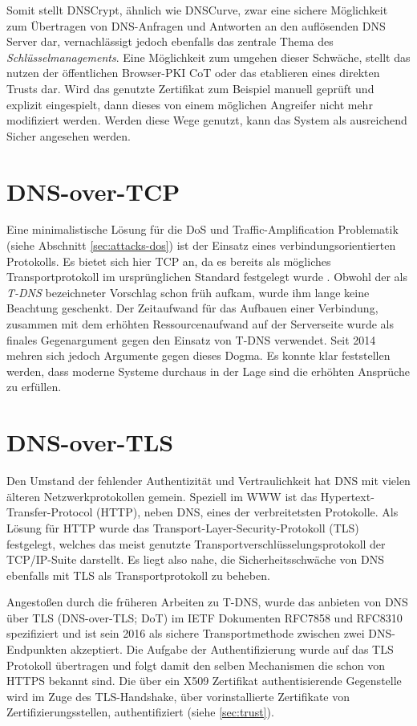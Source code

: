 Somit stellt DNSCrypt, ähnlich wie DNSCurve, zwar eine sichere  Möglichkeit zum Übertragen von DNS-Anfragen und Antworten an den auflösenden DNS Server dar, vernachlässigt jedoch ebenfalls das zentrale Thema des \textit{Schlüsselmanagements}. Eine Möglichkeit zum umgehen dieser Schwäche, stellt das nutzen der öffentlichen Browser-PKI CoT oder das etablieren eines direkten Trusts dar. Wird das genutzte Zertifikat zum Beispiel manuell geprüft und explizit eingespielt, dann dieses von einem möglichen Angreifer nicht mehr modifiziert werden. Werden diese Wege genutzt, kann das System als ausreichend Sicher angesehen werden.

\section{DNS-over-TCP}
Eine minimalistische Lösung für die DoS und Traffic-Amplification Problematik (siehe Abschnitt \ref{sec:attacks-dos}) ist der Einsatz eines verbindungsorientierten Protokolls. Es bietet sich hier TCP an, da es bereits als mögliches Transportprotokoll im ursprünglichen Standard festgelegt wurde \cite{rfc1035}. Obwohl der als \textit{T-DNS} bezeichneter Vorschlag schon früh aufkam, wurde ihm lange keine Beachtung geschenkt. Der Zeitaufwand für das Aufbauen einer Verbindung, zusammen mit dem erhöhten Ressourcenaufwand auf der Serverseite wurde als finales Gegenargument gegen den Einsatz von T-DNS verwendet. Seit 2014 mehren sich jedoch Argumente gegen dieses Dogma. Es konnte klar feststellen werden, dass moderne Systeme durchaus in der Lage sind die erhöhten Ansprüche zu erfüllen\cite{Zhu2015}. 

\section{DNS-over-TLS}
\label{sec:tec-dot}
Den Umstand der fehlender Authentizität und Vertraulichkeit hat DNS mit vielen älteren Netzwerkprotokollen gemein. Speziell im WWW ist das Hypertext-Transfer-Protocol (HTTP), neben DNS, eines der verbreitetsten Protokolle. Als Lösung für HTTP wurde das Transport-Layer-Security-Protokoll (TLS) festgelegt, welches das meist genutzte Transportverschlüsselungsprotokoll der TCP/IP-Suite darstellt. Es liegt also nahe, die Sicherheitsschwäche von DNS ebenfalls mit TLS als Transportprotokoll zu beheben.

Angestoßen durch die früheren Arbeiten zu T-DNS, wurde das anbieten von DNS über TLS (DNS-over-TLS; DoT) im IETF Dokumenten RFC7858\cite{rfc7858} und RFC8310\cite{Dickinson2018} spezifiziert und ist sein 2016 als sichere Transportmethode zwischen zwei DNS-Endpunkten akzeptiert. Die Aufgabe der Authentifizierung wurde auf das TLS Protokoll übertragen und folgt damit den selben Mechanismen die schon von HTTPS bekannt sind. Die über ein X509 Zertifikat authentisierende Gegenstelle wird im Zuge des TLS-Handshake, über vorinstallierte Zertifikate von Zertifizierungsstellen, authentifiziert (siehe \ref{sec:trust}).

